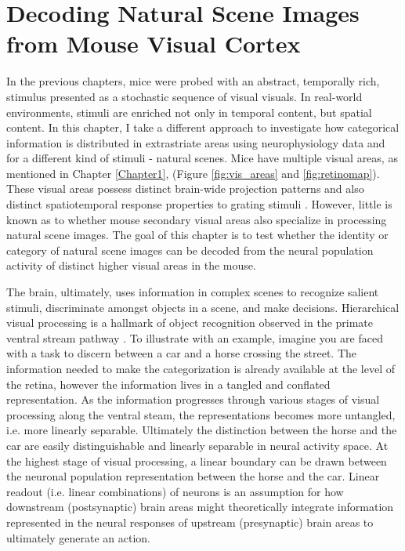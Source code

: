 \chapter{Decoding Natural Scene Images from Mouse Visual Cortex}
\label{Chapter5} 

In the previous chapters, mice were probed with an abstract, temporally rich, stimulus presented as a stochastic sequence of visual visuals. In real-world environments, stimuli are enriched not only in temporal content, but spatial content. In this chapter, I take a different approach to investigate how categorical information is distributed in extrastriate areas using neurophysiology data and for a different kind of stimuli - natural scenes. Mice have multiple visual areas, as mentioned in Chapter \ref{Chapter1}, (Figure \ref{fig:vis_areas} and \ref{fig:retinomap}). These visual areas possess distinct brain-wide projection patterns \parencite{Wang2012} and also distinct spatiotemporal response properties to grating stimuli  \parencite{Andermann2011,Marshel2011,Roth2012,Glickfeld2013a,Tohmi2014,Juavinett2015}. However, little is known as to whether mouse secondary visual areas also specialize in processing natural scene images. The goal of this chapter is to test whether the identity or category of natural scene images can be decoded from the neural population activity of distinct higher visual areas in the mouse.\par 

The brain, ultimately, uses information in complex scenes to recognize salient stimuli, discriminate amongst objects in a scene, and make decisions. Hierarchical visual processing is a hallmark of object recognition observed in the primate ventral stream pathway \parencite{DiCarlo2012}. To illustrate with an example, imagine you are faced with a task to discern between a car and a horse crossing the street. The information needed to make the categorization is already available at the level of the retina, however the information lives in a tangled and conflated representation. As the information progresses through various stages of visual processing along the ventral steam, the representations becomes more untangled, i.e. more linearly separable. Ultimately the distinction between the horse and the car are easily distinguishable and linearly separable in neural activity space. At the highest stage of visual processing, a linear boundary can be drawn between the neuronal population representation between the horse and the car. Linear readout (i.e. linear combinations) of neurons is an assumption for how downstream (postsynaptic) brain areas might theoretically integrate information represented in the neural responses of upstream (presynaptic) brain areas to ultimately generate an action.  

